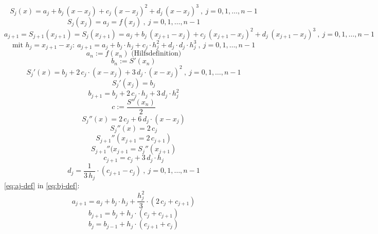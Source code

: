\begin{equation}
	S_j(x) = a_j + b_j\, (x-x_j) + c_j\, (x-x_j)^2 + d_j\, (x-x_j)^3\ , \ j=0,1,\ldots,n-1
\end{equation}
\begin{equation}
	S_j(x_j) = a_j = f(x_j)\ , \ j=0,1,\ldots,n-1
\end{equation}
\begin{equation} %
	a_{j+1} = S_{j+1}(x_{j+1}) = S_j(x_{j+1}) = a_j + b_j\, (x_{j+1}-x_j) + c_j\, (x_{j+1}-x_j)^2 + d_j\, (x_{j+1}-x_j)^3\ , \ j=0,1,\ldots,n-1
\end{equation}
\begin{equation}
	\text{mit } h_j = x_{j+1} - x_j:\ a_{j+1} = a_j + b_j \cdot h_j + c_j \cdot h_j^2 + d_j \cdot d_j \cdot h_j^3\ , \ j=0,1,\ldots,n-1
	\label{eq:aj-def}
\end{equation}
\begin{equation}
	a_n := f(x_n) \text{ (Hilfsdefinition)}
\end{equation}
\begin{equation}
	b_n := S'(x_n)
\end{equation}
\begin{equation}
	S_j'(x) = b_j + 2\, c_j \cdot (x-x_j) + 3\, d_j \cdot (x-x_j)^2\ , \ j=0,1,\ldots,n-1
\end{equation}
\begin{equation}
	S_j'(x_j) = b_j
\end{equation}
\begin{equation}
	b_{j+1} = b_j + 2\, c_j \cdot h_j + 3\, d_j \cdot h_j^2
	\label{eq:bj-def}
\end{equation}
\begin{equation}
	c := \frac{S''(x_n)}{2}
\end{equation}
\begin{equation}
	S_j''(x) = 2\, c_j + 6\, d_j \cdot (x-x_j)
\end{equation}
\begin{equation}
	S_j''(x) = 2\, c_j
\end{equation}
\begin{equation}
	S_{j+1}''(x_{j+1} = 2\, c_{j+1})
\end{equation}
\begin{equation}
	S_{j+1}''(x_{j+1} = S_j''(x_{j+1})
\end{equation}
\begin{equation}
	c_{j+1} = c_j + 3\, d_j \cdot h_j
\end{equation}
\begin{equation}
	d_j = \frac{1}{3\, h_j} \cdot (c_{j+1} - c_j)\ , \ j=0,1,\ldots,n-1
	\label{eq:dj-def}
\end{equation}
\autoref{eq:aj-def} in \autoref{eq:bj-def}:
\begin{equation}
	a_{j+1} = a_j + b_j \cdot h_j + \frac{h_j^2}{3} \cdot (2\, c_j + c_{j+1})
	\label{eq:aj+1}
\end{equation}
\begin{equation}
	b_{j+1} = b_j + h_j \cdot (c_j + c_{j+1})
\end{equation}
\begin{equation}
	b_j = b_{j-1} + h_j \cdot (c_{j+1} + c_j)
	\label{eq:bj2-def}
\end{equation}

